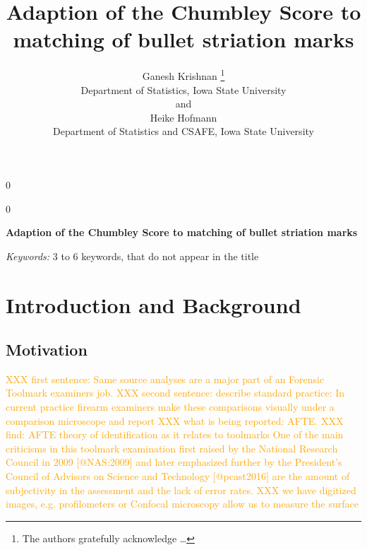\documentclass[12pt]{article}
\newcommand{\blind}{0}
\begin{document}
\def\spacingset#1{\renewcommand{\baselinestretch}%
{#1}\small\normalsize} \spacingset{1}



\blind
{
  \title{\bf Adaption of the Chumbley Score to matching of bullet striation marks}

  \author{
        Ganesh Krishnan \thanks{The authors gratefully acknowledge \ldots{}} \\
    Department of Statistics, Iowa State University\\
     and \\     Heike Hofmann \\
    Department of Statistics and CSAFE, Iowa State University\\
      }
  \maketitle
} \fi

\blind
{
  \bigskip
  \bigskip
  \bigskip
  \begin{center}
    {\LARGE\bf Adaption of the Chumbley Score to matching of bullet striation marks}
  \end{center}
  \medskip
} \fi

\bigskip
\begin{abstract}

\end{abstract}

\noindent%
{\it Keywords:} 3 to 6 keywords, that do not appear in the title
\vfill

\newpage
\spacingset{1.45} %

\newcommand{\hh}[1]{{\textcolor{orange}{#1}}}
\newcommand{\gk}[1]{{\textcolor{green}{#1}}}
\newcommand{\cited}[1]{{\textcolor{red}{#1}}}

\tableofcontents
\newpage

\section{Introduction and Background}\label{introduction-and-background}

\subsection{Motivation}\label{motivation}

\hh{XXX first sentence: Same source analyses are a major part of an Forensic Toolmark examiners job. XXX second sentence: describe standard practice: In current practice firearm examiners  make these comparisons visually under a comparison microscope and report XXX what is being reported: AFTE. XXX find: AFTE theory of identification as it relates to toolmarks  }
\hh{One of the main criticisms in this toolmark examination first raised by the National Research Council in 2009 [@NAS:2009] and later emphasized further by the President's Council of Advisors on Science and Technology [@pcast2016] are the amount of subjectivity in the assessment and the lack of error rates. }
\hh{XXX we have digitized images, e.g. profilometers or Confocal microscopy allow us to measure the surface}
\end{document}
